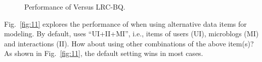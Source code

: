 \begin{figure}
  \centering
  \caption{Performance of \sys{} Versus LRC-BQ.}
  \label{fig:10}
\end{figure}


Fig.\ \ref{fig:11} explores the performance of \sys{} when using alternative data items for modeling.
By default, \sys{} uses ``UI+II+MI'', i.e., items of users (UI), microblogs (MI) and interactions (II).
How about using other combinations of the above item(s)?
As shown in Fig.\ \ref{fig:11}, the default setting wins in most cases.

